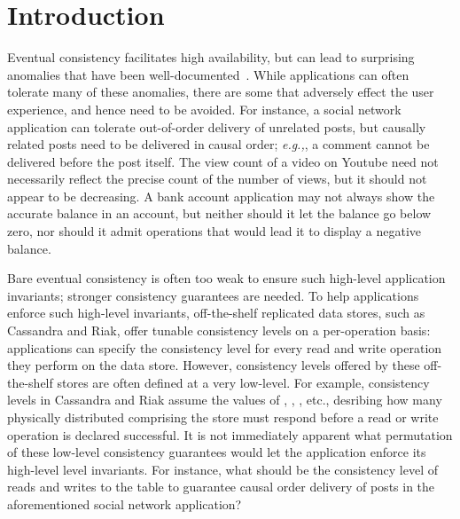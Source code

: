 \section{Introduction}
\label{sec:intro}

Eventual consistency facilitates high availability, but can lead to
surprising anomalies that have been
well-documented~\cite{Burckhardt2014, pldi15, Session, Dynamo,
  RedBlue}. While applications can often tolerate many of these
anomalies, there are some that adversely effect the user experience,
and hence need to be avoided. For instance, a social network
application can tolerate out-of-order delivery of unrelated posts, but
causally related posts need to be delivered in causal order;
\emph{e.g.,}, a comment cannot be delivered before the post
itself. The view count of a video on Youtube need not necessarily
reflect the precise count of the number of views, but it should not
appear to be decreasing. A bank account application may not always
show the accurate balance in an account, but neither should it let the
balance go below zero, nor should it admit operations that would
lead it to display a negative balance.

Bare eventual consistency is often too weak to ensure such high-level
application invariants; stronger consistency guarantees are needed. To
help applications enforce such high-level invariants, off-the-shelf
replicated data stores, such as Cassandra and Riak, offer tunable
consistency levels on a per-operation basis: applications can specify
the consistency level for every read and write operation they perform
on the data store. However, consistency levels offered by these
off-the-shelf stores are often defined at a very low-level. For
example, consistency levels in Cassandra and Riak assume the values of
, , ,  etc., desribing how many
physically distributed comprising the store must respond before a read
or write operation is declared successful.  It is not immediately
apparent what permutation of these low-level consistency guarantees
would let the application enforce its high-level level invariants. For
instance, what should be the consistency level of reads and writes to
the  table to guarantee causal order delivery of posts in the
aforementioned social network application?

